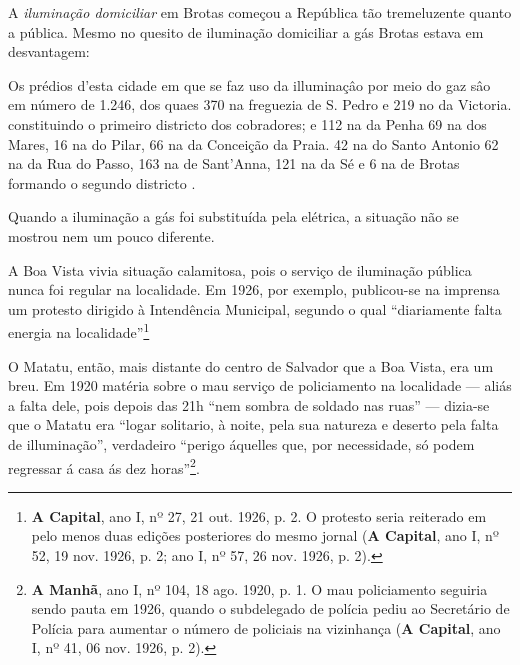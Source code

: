 A \textit{iluminação domiciliar} em Brotas começou a República tão tremeluzente quanto a pública. Mesmo no quesito de iluminação domiciliar a gás Brotas estava em desvantagem:

\begin{citacao}
Os prédios d'esta cidade em que se faz uso da illuminaçâo por meio do gaz sâo em número de 1.246, dos quaes 370 na freguezia de S. Pedro e 219 no da Victoria. constituindo o primeiro districto dos cobradores; e 112 na da Penha 69 na dos Mares, 16 na do Pilar, 66 na da Conceição da Praia. 42 na do Santo Antonio 62 na da Rua do Passo, 163 na de Sant'Anna, 121 na da Sé e 6 na de Brotas formando o segundo districto \cite[p.~151]{salvador_relatorio_1895}. 
\end{citacao}

Quando a iluminação a gás foi substituída pela elétrica, a situação não se mostrou nem um pouco diferente.

A Boa Vista vivia situação calamitosa, pois o serviço de iluminação pública nunca foi regular na localidade. Em 1926, por exemplo, publicou-se na imprensa um protesto dirigido à Intendência Municipal, segundo o qual ``diariamente falta energia na localidade''\footnote{\textbf{A Capital}, ano I, nº 27, 21 out. 1926, p. 2. O protesto seria reiterado em pelo menos duas edições posteriores do mesmo jornal (\textbf{A Capital}, ano I, nº 52, 19 nov. 1926, p. 2; ano I, nº 57, 26 nov. 1926, p. 2).}

O Matatu, então, mais distante do centro de Salvador que a Boa Vista, era um breu. Em 1920 matéria sobre o mau serviço de policiamento na localidade --- aliás a falta dele, pois depois das 21h ``nem sombra de soldado nas ruas'' --- dizia-se que o Matatu era ``logar solitario, à noite, pela sua natureza e deserto pela falta de illuminação'', verdadeiro ``perigo áquelles que, por necessidade, só podem regressar á casa ás dez horas''\footnote{\textbf{A Manhã}, ano I, nº 104, 18 ago. 1920, p. 1. O mau policiamento seguiria sendo pauta em 1926, quando o subdelegado de polícia pediu ao Secretário de Polícia para aumentar o número de policiais na vizinhança (\textbf{A Capital}, ano I, nº 41, 06 nov. 1926, p. 2).}.

